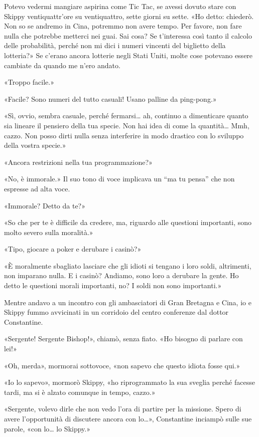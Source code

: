 Potevo vedermi mangiare aspirina come Tic Tac, se avessi dovuto stare
con Skippy ventiquattr'ore su ventiquattro, sette giorni su sette. «Ho
detto: chiederò. Non so se andremo in Cina, potremmo non avere tempo.
Per favore, non fare nulla che potrebbe metterci nei guai. Sai cosa? Se
t'interessa così tanto il calcolo delle probabilità, perché non mi dici
i numeri vincenti del biglietto della lotteria?» Se c'erano ancora
lotterie negli Stati Uniti, molte cose potevano essere cambiate da
quando me n'ero andato.

«Troppo facile.»

«Facile? Sono numeri del tutto casuali! Usano palline da ping-pong.»

«Sì, ovvio, sembra casuale, perché fermarsi\ldots{} ah, continuo a
dimenticare quanto sia lineare il pensiero della tua specie. Non hai
idea di come la quantità\ldots{} Mmh, cazzo. Non posso dirti nulla senza
interferire in modo drastico con lo sviluppo della vostra specie.»

«Ancora restrizioni nella tua programmazione?»

«No, è immorale.» Il suo tono di voce implicava un ``ma tu pensa'' che
non espresse ad alta voce.

«Immorale? Detto da te?»

«So che per te è difficile da credere, ma, riguardo alle questioni
importanti, sono molto severo sulla moralità.»

«Tipo, giocare a poker e derubare i casinò?»

«È moralmente sbagliato lasciare che gli idioti si tengano i loro soldi,
altrimenti, non imparano nulla. E i casinò? Andiamo, sono loro a
derubare la gente. Ho detto le questioni morali importanti, no? I soldi
non sono importanti.»

\hfill\break

Mentre andavo a un incontro con gli ambasciatori di Gran Bretagna e
Cina, io e Skippy fummo avvicinati in un corridoio del centro conferenze
dal dottor Constantine.

«Sergente! Sergente Bishop!», chiamò, senza fiato. «Ho bisogno di
parlare con lei!»

«Oh, merda», mormorai sottovoce, «non sapevo che questo idiota fosse
qui.»

«Io lo sapevo», mormorò Skippy, «ho riprogrammato la sua sveglia perché
facesse tardi, ma si è alzato comunque in tempo, cazzo.»

«Sergente, volevo dirle che non vedo l'ora di partire per la missione.
Spero di avere l'opportunità di discutere ancora con lo\ldots»,
Constantine inciampò sulle sue parole, «con lo\ldots{} lo Skippy.»

